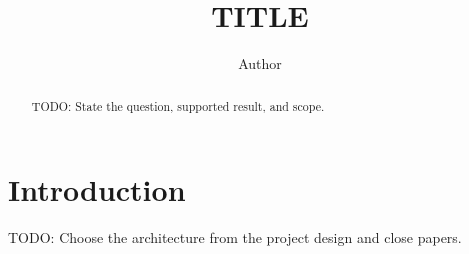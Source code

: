 \documentclass{article}
\title{{{TITLE}}}
\author{Author}
\date{}
\begin{document}
\maketitle
\begin{abstract}
TODO: State the question, supported result, and scope.
\end{abstract}
\section{Introduction}
TODO: Choose the architecture from the project design and close papers.
\end{document}
